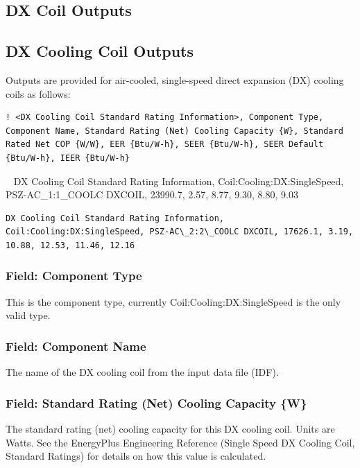 \subsection{DX Coil Outputs}\label{dx-coil-outputs}

\subsection{DX Cooling Coil Outputs}\label{dx-cooling-coil-outputs}

Outputs are provided for air-cooled, single-speed direct expansion (DX) cooling coils as follows:

\begin{lstlisting}
! <DX Cooling Coil Standard Rating Information>, Component Type, Component Name, Standard Rating (Net) Cooling Capacity {W}, Standard Rated Net COP {W/W}, EER {Btu/W-h}, SEER {Btu/W-h}, SEER Default {Btu/W-h}, IEER {Btu/W-h}
\end{lstlisting}
~ DX Cooling Coil Standard Rating Information, Coil:Cooling:DX:SingleSpeed, PSZ-AC\_1:1\_COOLC DXCOIL, 23990.7, 2.57, 8.77, 9.30, 8.80, 9.03
\begin{lstlisting}
DX Cooling Coil Standard Rating Information, Coil:Cooling:DX:SingleSpeed, PSZ-AC\_2:2\_COOLC DXCOIL, 17626.1, 3.19, 10.88, 12.53, 11.46, 12.16
\end{lstlisting}

\subsubsection{Field: Component Type}\label{field-component-type-3}

This is the component type, currently Coil:Cooling:DX:SingleSpeed is the only valid type.

\subsubsection{Field: Component Name}\label{field-component-name-3}

The name of the DX cooling coil from the input data file (IDF).

\subsubsection{Field: Standard Rating (Net) Cooling Capacity \{W\}}\label{field-standard-rating-net-cooling-capacity-w}

The standard rating (net) cooling capacity for this DX cooling coil. Units are Watts. See the EnergyPlus Engineering Reference (Single Speed DX Cooling Coil, Standard Ratings) for details on how this value is calculated.

